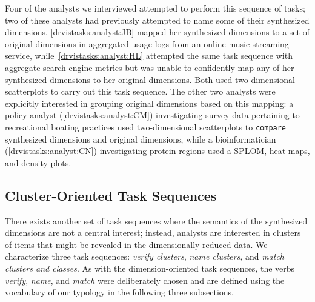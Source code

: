 Four of the analysts we interviewed attempted to perform this sequence of tasks; two of these analysts had previously attempted to name some of their synthesized dimensions.
\ref{drvistasks:analyst:JB} mapped her synthesized dimensions to a set of original dimensions in aggregated usage logs from an online music streaming service, while~\ref{drvistasks:analyst:HL} attempted the same task sequence with aggregate search engine metrics but was unable to confidently map any of her synthesized dimensions to her original dimensions. 
Both used two-dimensional scatterplots to carry out this task sequence. 
The other two analysts were explicitly interested in grouping original dimensions based on this mapping: a policy analyst (\ref{drvistasks:analyst:CM}) investigating survey data pertaining to recreational boating practices used two-dimensional scatterplots to {\tt compare} synthesized dimensions and original dimensions, while a bioinformatician (\ref{drvistasks:analyst:CN}) investigating protein regions used a \ac{SPLOM}, heat maps, and density plots.


\subsection{Cluster-Oriented Task Sequences}
\label{drvistasks:tasks:clusters}


There exists another set of task sequences where the semantics of the synthesized dimensions are not a central interest; instead, analysts are interested in clusters of items that might be revealed in the dimensionally reduced data. 
We characterize three task sequences: 
{\it verify clusters}, {\it name clusters}, and {\it match clusters and classes}.
As with the dimension-oriented task sequences, the verbs {\it verify}, {\it name}, and {\it match} were deliberately chosen and are defined using the vocabulary of our typology in the following three subsections.

